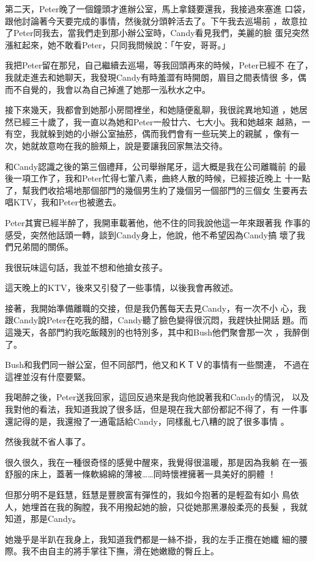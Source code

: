 第二天，Peter晚了一個鐘頭才進辦公室，馬上拿錢要還我，我接過來塞進
口袋，跟他討論著今天要完成的事情，然後就分頭幹活去了。下午我去巡場前
，故意拉了Peter同我去，當我們走到那小辦公室時，Candy看見我們，美麗的臉
蛋兒突然漲紅起來，她不敢看Peter，只同我問候說：「午安，哥哥。」

我把Peter留在那兒，自己繼續去巡場，等我回頭再來的時候，Peter已經不
在了，我就走進去和她聊天，我發現Candy有時羞澀有時開朗，眉目之間表情很
多，偶而不自覺的，我會以為自己掉進了她那一泓秋水之中。

接下來幾天，我都會到她那小房間裡坐，和她隨便亂聊，我很詫異地知道
，她居然已經三十歲了，我一直以為她和Peter一般廿六、七大小。我和她越來
越熟，一有空，我就躲到她的小辦公室抽菸，偶而我們會有一些玩笑上的親膩
，像有一次，她就故意吻在我的臉頰上，說是要讓我回家無法交待。

和Candy認識之後的第三個禮拜，公司舉辦尾牙，這大概是我在公司離職前
的最後一項工作了，我和Peter忙得七葷八素，曲終人散的時候，已經接近晚上
十一點了，幫我們收拾場地那個部門的幾個男生約了幾個另一個部門的三個女
生要再去唱KTV，我和Peter也被邀去。

Peter其實已經半醉了，我開車載著他，他不住的同我說他這一年來跟著我
作事的感受，突然他話頭一轉，談到Candy身上，他說，他不希望因為Candy搞
壞了我們兄弟間的關係。

我很玩味這句話，我並不想和他搶女孩子。

這天晚上的KTV，後來又引發了一些事情，以後我會再敘述。

接著，我開始準備離職的交接，但是我仍舊每天去見Candy，有一次不小
心，我跟Candy說Peter在吃我的醋，Candy聽了臉色變得很沉悶，我趕快扯開話
題。而這幾天，各部門約我吃飯餞別的也特別多，其中和Bush他們聚會那一次
，我醉倒了。

Bush和我們同一辦公室，但不同部門，他又和ＫＴＶ的事情有一些關連，
不過在這裡並沒有什麼要緊。

我喝醉之後，Peter送我回家，這回反過來是我向他說著我和Candy的情況，
以及我對他的看法，我知道我說了很多話，但是現在我大部份都記不得了，有
一件事還記得的是，我還撥了一通電話給Candy，同樣亂七八糟的說了很多事情
。

然後我就不省人事了。

很久很久，我在一種很奇怪的感覺中醒來，我覺得很溫暖，那是因為我躺
在一張舒服的床上，蓋著一條軟綿綿的薄被……同時懷裡擁著一具美好的胴體
！

但那分明不是鈺慧，鈺慧是豐腴富有彈性的，我如今抱著的是輕盈有如小
鳥依人，她埋首在我的胸膛，我不用撥起她的臉，只從她那黑瀑般柔亮的長髮
，我就知道，那是Candy。

她幾乎是半趴在我身上，我知道我們都是一絲不掛，我的左手正攬在她纖
細的腰際。我不由自主的將手掌往下撫，滑在她嫩緻的臀丘上。

